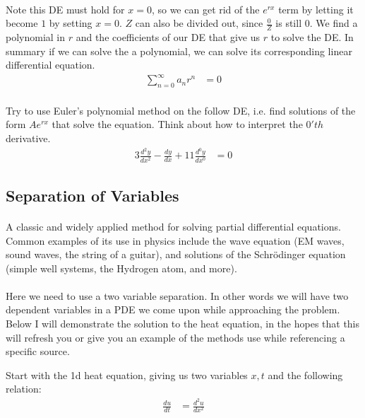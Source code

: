 \documentclass{article}
\begin{document}
	\paragraph{}
	Note this DE must hold for $x = 0$, so we can get rid of the $e^{rx}$ term by letting it become $1$ by setting $x = 0$. $Z$ can also be divided out, since $\frac{0}{Z}$ is still $0$. We find a polynomial in $r$ and the coefficients of our DE that give us $r$ to solve the DE. In summary if we can solve the a polynomial, we can solve its corresponding linear differential equation.
	\begin{align}
		\sum_{n=0}^{\infty}a_{n}r^{n}&= 0
	\end{align}

	\paragraph{}
	Try to use Euler's polynomial method on the follow DE, i.e. find solutions of the form $Ae^{rx}$ that solve the equation. Think about how to interpret the $0'th$ derivative.
	\begin{align}
		3\frac{d^{2}y}{dx^{2}} - \frac{dy}{dx} + 11\frac{d^{0}y}{dx^{0}} &= 0 
	\end{align}
\subsection{Separation of Variables}
	\paragraph{}
	A classic and widely applied method for solving partial differential equations. Common examples of its use in physics include the wave equation (EM waves, sound waves, the string of a guitar), and solutions of the Schrödinger equation (simple well systems, the Hydrogen atom, and more).
	
	\paragraph{}
	Here we need to use a two variable separation. In other words we will have two dependent variables in a PDE we come upon while approaching the problem. Below I will demonstrate the solution to the heat equation, in the hopes that this will refresh you or give you an example of the methods use while referencing a specific source.
	
	Start with the 1d heat equation, giving us two variables $x,t$ and the following relation:
	\begin{align}
		\frac{du}{dt} &= \frac{d^{2}u}{dx^{2}}\\
	\end{align}
\end{document}
